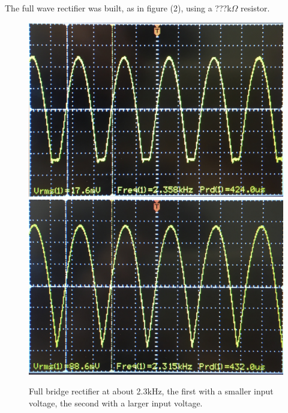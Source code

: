 \documentclass[twocolumn, amsmath]{revtex4}
\begin{document}
The full wave rectifier was built, as in figure (2), using a ???k$\Omega$ resistor. %
\begin{figure}[h]
    \includegraphics[scale=0.04]{fullbridge1}  
    \includegraphics[scale=0.039]{fullbridge2} 
    \caption{Full bridge rectifier at about 2.3kHz, the first with a smaller input voltage, the second with a larger input voltage.}
\end{figure}
\end{document}
